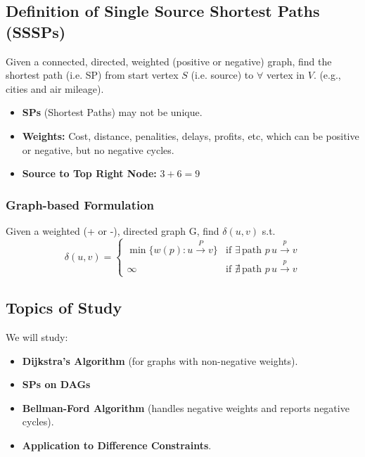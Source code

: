 \subsection{Definition of Single Source Shortest Paths (SSSPs)}
\begin{definition}
    Given a connected, directed, weighted (positive or negative) graph, find the shortest path (i.e. SP) from start vertex \( S \) (i.e. source) to \(\forall\) vertex in $V$. (e.g., cities and air mileage).

    \begin{itemize}
        \item \textbf{SPs} (Shortest Paths) may not be unique.
    \end{itemize}

    \begin{itemize}
        \item \textbf{Weights:} Cost, distance, penalities, delays, profits, etc, which can be positive or negative, but no negative cycles.  
        \item \textbf{Source to Top Right Node:} $3 + 6 = 9$
    \end{itemize}
\end{definition}

\subsubsection{Graph-based Formulation}
\begin{definition}
    Given a weighted (+ or -), directed graph G, find $\delta(u,v)$ s.t.
    \[
    \delta(u, v) = \begin{cases} 
        \min \{ w(p) : u  \overset{P}{\rightarrow} v \} & \text{if } \exists \, \text{path } p \, u \overset{p}{\rightarrow} v \\
        \infty & \text{if } \nexists \, \text{path } p \, u \overset{p}{\rightarrow} v
    \end{cases}
    \]
\end{definition}

\subsection{Topics of Study}
\begin{summary}
    We will study:
    \begin{itemize}
        \item \textbf{Dijkstra's Algorithm} (for graphs with non-negative weights).
        \item \textbf{SPs on DAGs}
        \item \textbf{Bellman-Ford Algorithm} (handles negative weights and reports negative cycles).
        \item \textbf{Application to Difference Constraints}.
    \end{itemize}
\end{summary}


